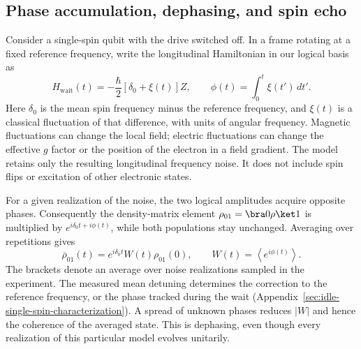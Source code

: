 \subsection{Phase accumulation, dephasing, and spin echo}

Consider a single-spin qubit with the drive switched off. In a frame
rotating at a fixed reference frequency, write the longitudinal
Hamiltonian in our logical basis as
\begin{equation}
 H_{\mathrm{wait}}(t)=-\frac{\hbar}{2}
                 [\delta_0+\xi(t)]Z,
 \qquad
 \phi(t)=\int_0^t\xi(t')\,dt'.
 \label{eq:platform-wait-noise}
\end{equation}
Here $\delta_0$ is the mean spin frequency minus the reference
frequency, and $\xi(t)$ is a classical fluctuation of that difference,
with units of angular frequency. Magnetic fluctuations can change
the local field; electric fluctuations can change the effective
$g$ factor or the position of the electron in a field gradient.
The model retains only the resulting longitudinal frequency noise.
It does not include spin flips or excitation of other electronic
states.

For a given realization of the noise, the two logical amplitudes
acquire opposite phases. Consequently the density-matrix element
$\rho_{01}=\bra0\rho\ket1$ is multiplied by
$e^{i\delta_0t+i\phi(t)}$, while both populations stay unchanged.
Averaging over repetitions gives
\begin{equation}
 \overline{\rho}_{01}(t)
       =e^{i\delta_0t}W(t)\rho_{01}(0),
 \qquad W(t)=\left\langle e^{i\phi(t)}\right\rangle.
 \label{eq:platform-phase-coherence}
\end{equation}
The brackets denote an average over noise realizations sampled in
the experiment. The measured mean detuning determines the correction
to the reference frequency, or the phase tracked during the wait
(Appendix~\ref{sec:idle-single-spin-characterization}).
A spread of unknown phases reduces $|W|$ and
hence the coherence of the averaged state. This is dephasing, even
though every realization of this particular model evolves unitarily.

